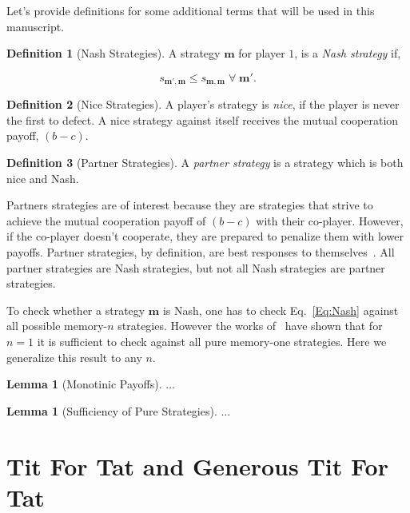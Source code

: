 \documentclass{article}
\theoremstyle{definition}
\newtheorem{definition}{Definition}[section]
\newtheorem{lemma}[theorem]{Lemma}
\begin{document}
Let's provide definitions for some additional terms that will be used in this
manuscript.

\begin{definition}[Nash Strategies]
A strategy $\mathbf{m}$ for player $1$, is a \textit{Nash
strategy} if,

\begin{equation}\label{Eq:Nash}
    s_{\mathbf{m'},\mathbf{m}} \leq s_{\mathbf{m},\mathbf{m}} \;\forall \; \mathbf{m'}.
\end{equation}
\end{definition}

\begin{definition}[Nice Strategies] A player's strategy is \textit{nice}, if
the player is never the first to defect. A nice strategy against itself receives
the mutual cooperation payoff, $(b - c)$.
\end{definition}

\begin{definition}[Partner Strategies]
A \textit{partner strategy} is a strategy which is both nice and Nash.
\end{definition}

Partners strategies are of interest because they are strategies that strive to
achieve the mutual cooperation payoff of $(b - c)$ with their co-player.
However, if the co-player doesn't cooperate, they are prepared to penalize them
with lower payoffs. Partner strategies, by definition, are best responses to
themselves~\citep{Hilbe:GEB:2015}. All partner
strategies are Nash strategies, but not all Nash strategies are partner
strategies.

To check whether a strategy \(\mathbf{m}\) is Nash, one has to check
Eq.~\eqref{Eq:Nash} against all possible memory-$n$ strategies. However the
works of~\citep{mcavoy:PRSA:2019, Mcavoy:PNAS:2022} have shown that for $n=1$ it
is sufficient to check against all pure memory-one strategies. Here we
generalize this result to any $n$.

\begin{lemma}[Monotinic Payoffs]\label{lemma:monotonic_payoffs}
$\dots$
\end{lemma}

\begin{lemma}[Sufficiency of Pure Strategies]\label{lemma:sufficiency_pure_strategies}
$\dots$
\end{lemma}

\section{Tit For Tat and Generous Tit For Tat}
\end{document}
